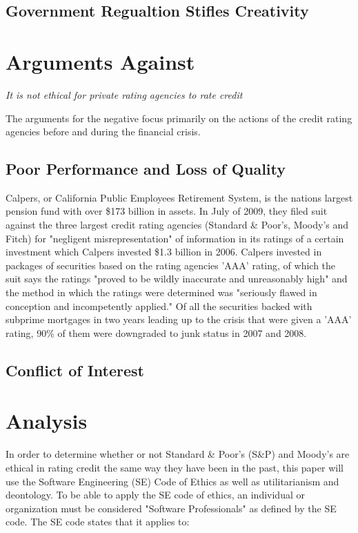 \documentclass[11pt]{article}
\begin{document}
\begin{multicols}{2}
\subsection{Government Regualtion Stifles Creativity}

\section{Arguments Against}
\textit{It is not ethical for private rating agencies to rate credit}

The arguments for the negative focus primarily on the actions of the credit rating agencies before and during the financial crisis. 
\subsection{Poor Performance and Loss of Quality}
Calpers, or California Public Employees Retirement System, is the nations largest pension fund with over \$173 billion in assets.  In July of 2009, they filed suit against the three largest credit rating agencies (Standard \& Poor's, Moody's and Fitch) for "negligent misrepresentation" of information in its ratings of a certain investment which Calpers invested \$1.3 billion in 2006.  Calpers invested in packages of securities based on the rating agencies 'AAA' rating, of which the suit says the ratings "proved to be wildly inaccurate and unreasonably high" and the method in which the ratings were determined was "seriously flawed in conception and incompetently applied." \cite{nyTimesCalpers}  Of all the securities backed with subprime mortgages in two years leading up to the crisis that were given a 'AAA' rating, 90\% of them were downgraded to junk status in 2007 and 2008. \cite{ratingEthics}

\subsection{Conflict of Interest}

\section{Analysis}
In order to determine whether or not Standard \& Poor's (S\&P) and Moody's are ethical in rating credit the same way they have been in the past, this paper will use the Software Engineering (SE) Code of Ethics as well as utilitarianism and deontology.  To be able to apply the SE code of ethics, an individual or organization must be considered "Software Professionals" as defined by the SE code. The SE code states that it applies to:


\end{multicols}
\end{document}
